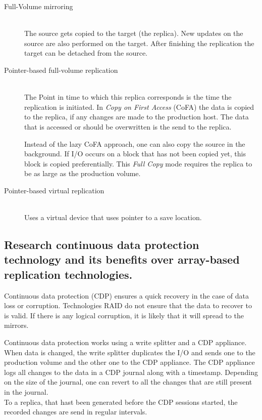		\begin{description}
			\item[Full-Volume mirroring] \hfill \\
				The source gets copied to the target (the replica).
				New updates on the source are also performed on the target.
				After finishing the replication the target can be detached from the source.
			\item[Pointer-based full-volume replication] \hfill \\
				The Point in time to which this replica corresponds is the time 
				the replication is initiated.
				In \emph{Copy on First Access} (CoFA) the data is copied to the replica,
				if any changes are made to the production host.
				The data that is accessed or should be overwritten is the send to
				the replica.

				Instead of the lazy CoFA approach,
				one can also copy the source in the background.
				If I/O occurs on a block that has not been copied yet,
				this block is copied preferentially.
				This \emph{Full Copy} mode requires the replica to be as large
				as the production volume.
			\item[Pointer-based virtual replication] \hfill \\
				Uses a virtual device that uses pointer to a save location.
		\end{description}

\subsection{Research continuous data protection technology and its benefits over array-based replication technologies.} %
\label{sub:research_continuous_data_protection_technology_and_its_benefits_over_array_based_replication_technologies}
	Continuous data protection (CDP) ensures a quick recovery
	in the case of data loss or corruption.
	Technologies RAID do not ensure that the data to recover to is valid.
	If there is any logical corruption,
	it is likely that it will spread to the mirrors.

	Continuous data protection works using a write splitter
	and a CDP appliance.
	When data is changed,
	the write splitter duplicates the I/O 
	and sends one to the production volume
	and the other one to the CDP appliance.
	The CDP appliance logs all changes to the data
	in a CDP journal along with a timestamp.
	Depending on the size of the journal,
	one can revert to all the changes that are still present in the journal.\\
	To a replica,
	that hast been generated before the CDP sessions started,
	the recorded changes are send in regular intervals.


